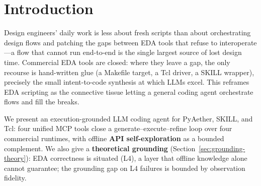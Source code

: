 \section{Introduction}
\label{sec:introduction}

Design engineers' daily work is less about fresh scripts than about orchestrating design flows and patching the gaps between EDA tools that refuse to interoperate---a flow that cannot run end-to-end is the single largest source of lost design time. Commercial EDA tools are closed: where they leave a gap, the only recourse is hand-written glue (a Makefile target, a Tcl driver, a SKILL wrapper), precisely the small intent-to-code synthesis at which LLMs excel. This reframes EDA scripting as the connective tissue letting a general coding agent orchestrate flows and fill the breaks.

We present an execution-grounded LLM coding agent for PyAether, SKILL, and Tcl: four unified MCP tools \cite{lee2025autoeda} close a generate--execute--refine loop over four commercial runtimes, with offline \textbf{API self-exploration} as a bounded complement. We also give a \textbf{theoretical grounding} (Section~\ref{sec:grounding-theory}): EDA correctness is situated (L4), a layer that offline knowledge alone cannot guarantee; the grounding gap on L4 failures is bounded by observation fidelity.



